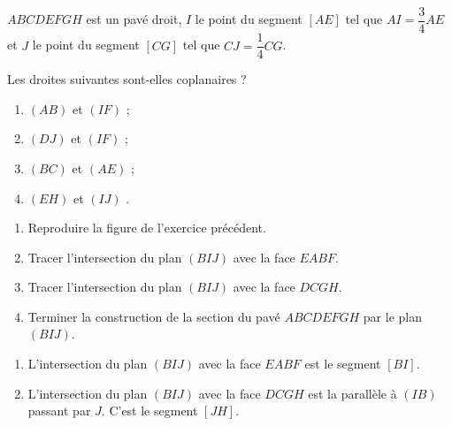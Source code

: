 \documentclass{cornouaille}
\begin{document}
\begin{colonne*exercice}
\begin{exercice}
  $ABCDEFGH$ est un pavé droit, $I$ le point du segment $[AE]$ tel que
  $AI=\dfrac{3}{4}AE$ et $J$ le point du segment $[CG]$ tel que
  $CJ=\dfrac{1}{4}CG$.

  Les droites suivantes sont-elles coplanaires ?
  \begin{enumerate}
  \item $(AB)$ et $(IF)$ ;
  \item $(DJ)$ et $(IF)$ ;
  \item $(BC)$ et $(AE)$ ;
  \item $(EH)$ et $(IJ)$ .
  \end{enumerate}
\end{exercice}


\begin{exercice*}\label{ex23G2}

\vspace{-\baselineskip}
  \begin{enumerate}
  \item Reproduire la figure de l'exercice précédent.
  \item Tracer l'intersection du plan $(BIJ)$ avec la face $EABF$.
  \item Tracer l'intersection du plan $(BIJ)$ avec la face $DCGH$.
  \item Terminer la construction de la section du pavé $ABCDEFGH$ par
    le plan $(BIJ)$.
  \end{enumerate}
\end{exercice*}
\begin{corrige}
  \begin{enumerate}
\item L'intersection du plan $(BIJ)$ avec la face $EABF$ est le segment $[BI]$.
\item L'intersection du plan $(BIJ)$ avec la face $DCGH$ est la
  parallèle à $(IB)$ passant par $J$. C'est le segment $[JH]$.


\end{enumerate}
\end{corrige}
\end{colonne*exercice}
\end{document}
